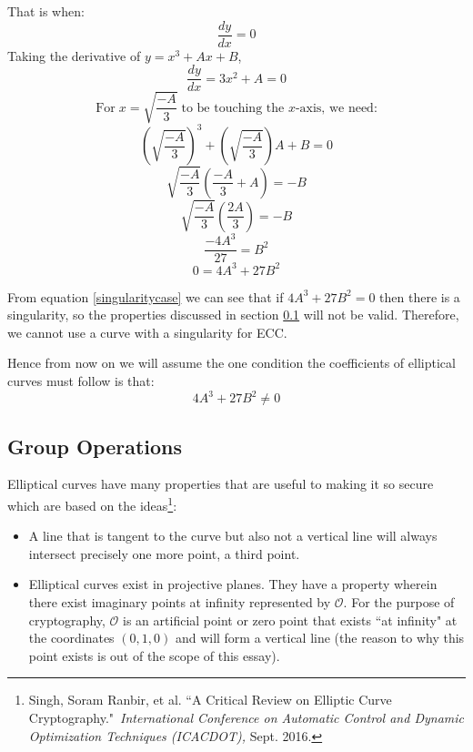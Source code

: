 \documentclass[a4paper,12pt]{article}
\theoremstyle{definition}
\begin{document}
That is when:
\begin{equation*}
	 \frac{dy}{dx} = 0
\end{equation*}
Taking the derivative of $y=x^3 + Ax +B$,
\begin{equation*}
	\frac{dy}{dx} = 3x^2 + A =0
\end{equation*}
\begin{equation*}
	\text{For} \; x= \sqrt{\frac{-A}{3}} \; \text{to be touching the $x$-axis, we need:}
\end{equation*}
\begin{equation*}
	\left(\sqrt{\frac{-A}{3}}\right)^3 +\left(\sqrt{\frac{-A}{3}}\right)A + B=0
\end{equation*}
\begin{equation*}
	\sqrt{\frac{-A}{3}}\left(\frac{-A}{3}+A\right)=-B
\end{equation*}
\begin{equation*}
		\sqrt{\frac{-A}{3}}\left(\frac{2A}{3}\right)=-B
\end{equation*}
\begin{equation*}
	\frac{-4A^3}{27}=B^2
\end{equation*}
\begin{equation} \label{singularitycase}
	0=4A^3+27B^2
\end{equation}

From equation \ref{singularitycase} we can see that if $4A^3+27B^2=0$ then there is a singularity,  so the properties discussed in section \ref{properties} will not be valid. Therefore, we cannot use a curve with a singularity for ECC.

Hence from now on we will assume the one condition the coefficients of elliptical curves must follow is that:
\begin{equation}
		 4A^3+27B^2 \neq 0
\end{equation}

\subsection{Group Operations} \label{properties}
Elliptical curves have many properties that are useful to making it so secure which are based on the ideas\footnote{Singh, Soram Ranbir, et al. ``A Critical Review on Elliptic Curve Cryptography." \textit{International Conference on Automatic Control and Dynamic Optimization Techniques (ICACDOT),} Sept. 2016.}:
\begin{itemize}
	\item A line that is tangent to the curve but also not a vertical line will always intersect precisely one more point, a third point.
	\item Elliptical curves exist in projective planes. They have a property wherein there exist imaginary points at infinity represented by $\mathcal{O}$. For the purpose of cryptography, $\mathcal{O}$ is an artificial point or zero point that exists ``at infinity" at the coordinates $(0,1,0)$ and will form a vertical line (the reason to why this point exists is out of the scope of this essay).
\end{itemize}
\end{document}
